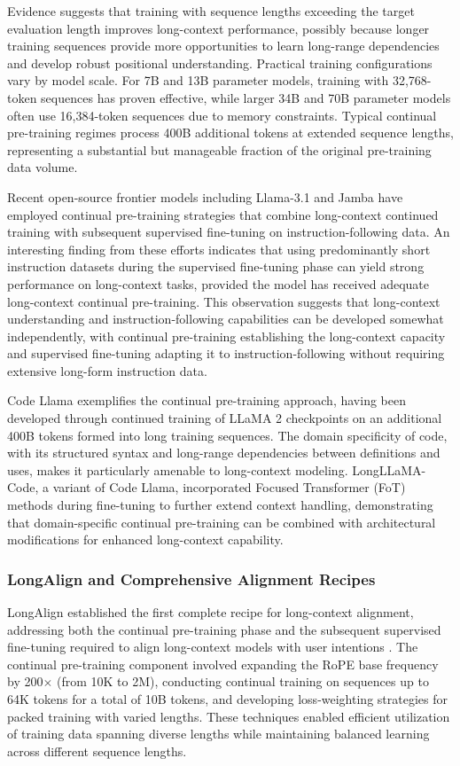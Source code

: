 Evidence suggests that training with sequence lengths exceeding the target evaluation length improves long-context performance, possibly because longer training sequences provide more opportunities to learn long-range dependencies and develop robust positional understanding. Practical training configurations vary by model scale. For 7B and 13B parameter models, training with 32,768-token sequences has proven effective, while larger 34B and 70B parameter models often use 16,384-token sequences due to memory constraints. Typical continual pre-training regimes process 400B additional tokens at extended sequence lengths, representing a substantial but manageable fraction of the original pre-training data volume.

Recent open-source frontier models including Llama-3.1 and Jamba have employed continual pre-training strategies that combine long-context continued training with subsequent supervised fine-tuning on instruction-following data. An interesting finding from these efforts indicates that using predominantly short instruction datasets during the supervised fine-tuning phase can yield strong performance on long-context tasks, provided the model has received adequate long-context continual pre-training. This observation suggests that long-context understanding and instruction-following capabilities can be developed somewhat independently, with continual pre-training establishing the long-context capacity and supervised fine-tuning adapting it to instruction-following without requiring extensive long-form instruction data.

Code Llama exemplifies the continual pre-training approach, having been developed through continued training of LLaMA 2 checkpoints on an additional 400B tokens formed into long training sequences. The domain specificity of code, with its structured syntax and long-range dependencies between definitions and uses, makes it particularly amenable to long-context modeling. LongLLaMA-Code, a variant of Code Llama, incorporated Focused Transformer (FoT) methods during fine-tuning to further extend context handling, demonstrating that domain-specific continual pre-training can be combined with architectural modifications for enhanced long-context capability.

\subsubsection{LongAlign and Comprehensive Alignment Recipes}

LongAlign established the first complete recipe for long-context alignment, addressing both the continual pre-training phase and the subsequent supervised fine-tuning required to align long-context models with user intentions \citep{longalign2024}. The continual pre-training component involved expanding the RoPE base frequency by 200$\times$ (from 10K to 2M), conducting continual training on sequences up to 64K tokens for a total of 10B tokens, and developing loss-weighting strategies for packed training with varied lengths. These techniques enabled efficient utilization of training data spanning diverse lengths while maintaining balanced learning across different sequence lengths.

